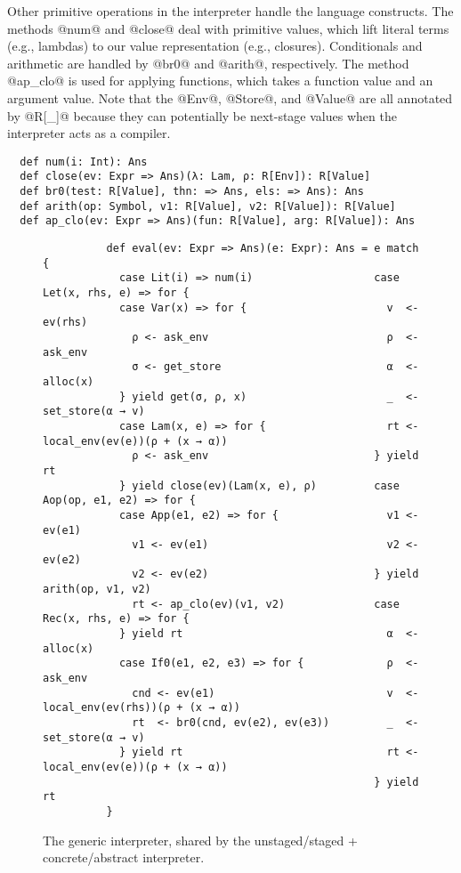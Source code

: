 Other primitive operations in the interpreter handle the language constructs.  The
methods @num@ and @close@ deal with primitive values, which lift literal terms
(e.g., lambdas) to our value representation (e.g., closures).  
Conditionals and arithmetic are handled by @br0@ and @arith@, respectively. The
method @ap_clo@ is used for applying functions, which takes a function value
and an argument value. Note that the @Env@, @Store@, and @Value@ are all
annotated by @R[_]@ because they can potentially be next-stage values when the
interpreter acts as a compiler.
\begin{lstlisting}
  def num(i: Int): Ans
  def close(ev: Expr => Ans)(λ: Lam, ρ: R[Env]): R[Value]
  def br0(test: R[Value], thn: => Ans, els: => Ans): Ans
  def arith(op: Symbol, v1: R[Value], v2: R[Value]): R[Value]
  def ap_clo(ev: Expr => Ans)(fun: R[Value], arg: R[Value]): Ans
\end{lstlisting}

\begin{figure}[h!]
  \centering
  \begin{lstlisting}
          def eval(ev: Expr => Ans)(e: Expr): Ans = e match {
            case Lit(i) => num(i)                   case Let(x, rhs, e) => for {
            case Var(x) => for {                      v  <- ev(rhs)
              ρ <- ask_env                            ρ  <- ask_env
              σ <- get_store                          α  <- alloc(x)
            } yield get(σ, ρ, x)                      _  <- set_store(α → v)
            case Lam(x, e) => for {                   rt <- local_env(ev(e))(ρ + (x → α))
              ρ <- ask_env                          } yield rt
            } yield close(ev)(Lam(x, e), ρ)         case Aop(op, e1, e2) => for {
            case App(e1, e2) => for {                 v1 <- ev(e1)                                               
              v1 <- ev(e1)                            v2 <- ev(e2)
              v2 <- ev(e2)                          } yield arith(op, v1, v2)
              rt <- ap_clo(ev)(v1, v2)              case Rec(x, rhs, e) => for {
            } yield rt                                α  <- alloc(x)
            case If0(e1, e2, e3) => for {             ρ  <- ask_env
              cnd <- ev(e1)                           v  <- local_env(ev(rhs))(ρ + (x → α))
              rt  <- br0(cnd, ev(e2), ev(e3))         _  <- set_store(α → v)
            } yield rt                                rt <- local_env(ev(e))(ρ + (x → α))
                                                    } yield rt                    
          }
  \end{lstlisting}
\caption{The generic interpreter,
  shared by the unstaged/staged + concrete/abstract interpreter.}
\label{fig:shared_int}
\end{figure}

